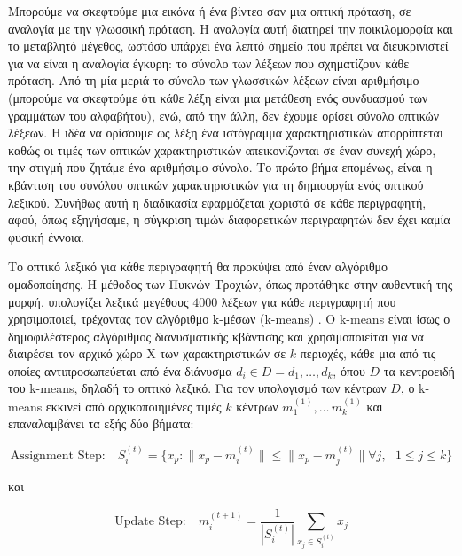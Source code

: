 \documentclass[11pt,a4paper,english,greek,twoside]{../Thesis}
\begin{document}
\par Μπορούμε να σκεφτούμε μια εικόνα ή ένα βίντεο σαν μια οπτική πρόταση, σε αναλογία με την γλωσσική πρόταση. Η αναλογία αυτή διατηρεί την ποικιλομορφία και το μεταβλητό μέγεθος, ωστόσο υπάρχει ένα λεπτό σημείο που πρέπει να διευκρινιστεί για να είναι η αναλογία έγκυρη: το σύνολο των λέξεων που σχηματίζουν κάθε πρόταση. Από τη μία μεριά το σύνολο των γλωσσικών λέξεων είναι αριθμήσιμο (μπορούμε να σκεφτούμε ότι κάθε λέξη είναι μια μετάθεση ενός συνδυασμού των γραμμάτων του αλφαβήτου), ενώ, από την άλλη, δεν έχουμε ορίσει σύνολο οπτικών λέξεων. Η ιδέα να ορίσουμε ως λέξη ένα ιστόγραμμα χαρακτηριστικών απορρίπτεται καθώς οι τιμές των οπτικών χαρακτηριστικών απεικονίζονται σε έναν συνεχή χώρο, την στιγμή που ζητάμε ένα αριθμήσιμο σύνολο. Το πρώτο βήμα επομένως, είναι η κβάντιση του συνόλου οπτικών χαρακτηριστικών για τη δημιουργία ενός οπτικού λεξικού. Συνήθως αυτή η διαδικασία εφαρμόζεται χωριστά σε κάθε περιγραφητή, αφού, όπως εξηγήσαμε, η σύγκριση τιμών διαφορετικών περιγραφητών δεν έχει καμία φυσική έννοια.

\par Το οπτικό λεξικό για κάθε περιγραφητή θα προκύψει από έναν αλγόριθμο ομαδοποίησης. Η μέθοδος των Πυκνών Τροχιών, όπως προτάθηκε στην αυθεντική της μορφή, υπολογίζει λεξικά μεγέθους $4000$ λέξεων για κάθε περιγραφητή που χρησιμοποιεί, τρέχοντας τον αλγόριθμο k-μέσων (k-means) \cite{steinhaus_1956}. Ο k-means είναι ίσως ο δημοφιλέστερος αλγόριθμος διανυσματικής κβάντισης και χρησιμοποιείται για να διαιρέσει τον αρχικό χώρο X των χαρακτηριστικών σε $k$ περιοχές, κάθε μια από τις οποίες αντιπροσωπεύεται από ένα διάνυσμα $d_i\in D = d_1, \dots , d_k$, όπου $D$ τα κεντροειδή του k-means, δηλαδή το οπτικό λεξικό. Για τον υπολογισμό των κέντρων $D$, ο k-means εκκινεί από αρχικοποιημένες τιμές $k$ κέντρων $m_1^{(1)}, \dots\, m_k^{(1)}$ και επαναλαμβάνει τα εξής δύο βήματα:

\begin{equation}\label{eq:kmeansAssign}
    \text{Assignment Step: } \text{ } S_i^{(t)}=\{ x_p: \| x_p-m_i^{(t)}\| \leq \| x_p-m_j^{(t)}\|  \forall j, \text{ } 1 \leq j \leq k \}
\end{equation}

και

\begin{equation}\label{eq:kmeansUpdate}
    \text{Update Step: } \text{   } m_i^{(t+1)}=\frac{1}{| S_i^{(t)} |} \sum_{x_j \in S_i^{(t)}} x_j
\end{equation}
\end{document}
